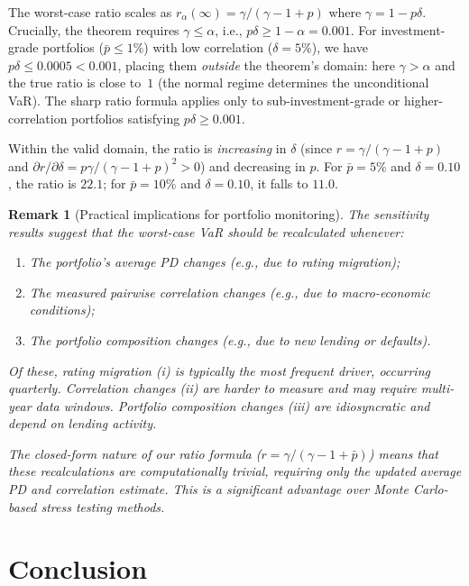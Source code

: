 \documentclass[11pt]{article}
\newtheorem{remark}[theorem]{Remark}
\theoremstyle{definition}
\newcommand{\1}{\mathbf{1}}
\begin{document}
The worst-case ratio scales as $r_\alpha(\infty) = \gamma/(\gamma - 1 + p)$ where $\gamma = 1 - p\delta$. Crucially, the theorem requires $\gamma \leq \alpha$, i.e., $p\delta \geq 1-\alpha = 0.001$. For investment-grade portfolios ($\bar{p} \leq 1\%$) with low correlation ($\delta = 5\%$), we have $p\delta \leq 0.0005 < 0.001$, placing them \emph{outside} the theorem's domain: here $\gamma > \alpha$ and the true ratio is close to~$1$ (the normal regime determines the unconditional VaR). The sharp ratio formula applies only to sub-investment-grade or higher-correlation portfolios satisfying $p\delta \geq 0.001$.

Within the valid domain, the ratio is \emph{increasing} in $\delta$ (since $r = \gamma/(\gamma-1+p)$ and $\partial r/\partial\delta = p\gamma/(\gamma-1+p)^2 > 0$) and decreasing in $p$. For $\bar{p} = 5\%$ and $\delta = 0.10$, the ratio is $22.1$; for $\bar{p} = 10\%$ and $\delta = 0.10$, it falls to $11.0$.

\begin{remark}[Practical implications for portfolio monitoring]
The sensitivity results suggest that the worst-case VaR should be recalculated whenever:
\begin{enumerate}[label=(\roman*)]
  \item The portfolio's average PD changes (e.g., due to rating migration);
  \item The measured pairwise correlation changes (e.g., due to macro-economic conditions);
  \item The portfolio composition changes (e.g., due to new lending or defaults).
\end{enumerate}
Of these, rating migration (i) is typically the most frequent driver, occurring quarterly. Correlation changes (ii) are harder to measure and may require multi-year data windows. Portfolio composition changes (iii) are idiosyncratic and depend on lending activity.

The closed-form nature of our ratio formula ($r = \gamma/(\gamma - 1 + \bar{p})$) means that these recalculations are computationally trivial, requiring only the updated average PD and correlation estimate. This is a significant advantage over Monte Carlo-based stress testing methods.
\end{remark}

\section{Conclusion}\label{sec:conclusion}
\end{document}
